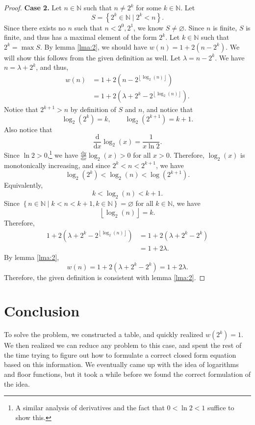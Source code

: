 \documentclass[11pt, letterpaper]{article}
\begin{document}
\begin{proof}
	\textbf{Case 2.} Let $n\in\mathbb{N}$ such that $n\neq 2^k$ for some $k\in\mathbb{N}$. Let
	\[
		S=\left\{ 2^k\in\mathbb{N} \mid 2^k<n \right\} 
	.\]
	Since there exists no $n$ such that $n<2^0,2^1$, we know $S\neq \varnothing$. Since $n$ is finite, $S$ is finite, and thus has a maximal element of the form $2^k$. Let $k\in\mathbb{N}$ such that $2^k=\max S$. By lemma \ref{lma:2}, we should have $w(n)=1+2\left( n-2^k \right) $. We will show this follows from the given definition as well. Let $\lambda =n-2^k$. We have $n=\lambda +2^k$, and thus,
	\begin{align*}
		w(n)&=1+2\left( n-2^{\left\lfloor \log _2(n) \right\rfloor} \right) \\
		    &=1+2\left( \lambda +2^k-2^{\left\lfloor \log_2\left( n \right)  \right\rfloor} \right) 
	.\end{align*}
	Notice that $2^{k+1}>n$ by definition of $S$ and $n$, and notice that
	\[
		\log_2\left( 2^k \right) =k,\qquad \log_2\left( 2^{k+1} \right) =k+1
	.\]
	 Also notice that
	 \[
	 	\frac{\mathrm{d}}{\mathrm{d}x} \log_2(x)=\frac{1}{x\ln 2}
	 .\]
	 Since $\ln 2>0$,\footnote{A similar analysis of derivatives and the fact that $0<\ln 2<1$ suffice to show this.} we have $ \frac{\mathrm{d}y}{\mathrm{d}x}\log_2(x)>0$ for all $x>0$. Therefore, $\log_2(x)$ is monotonically increasing, and since $2^k<n<2^{k+1}$, we have
	 \[
	 	\log_2\left( 2^k \right) <\log_2(n)<\log\left( 2^{k+1} \right) 
	 .\]
	 Equivalently,
	 \[
	 	k<\log_2(n)<k+1
	 .\]
	 Since $\left\{ n\in\mathbb{N} \mid k<n<k+1,k\in\mathbb{N} \right\} =\varnothing$ for all $k\in\mathbb{N}$, we have
	 \[
	 	\left\lfloor \log_2(n) \right\rfloor=k
	 .\]
	 Therefore,
	 \begin{align*}
		 1+2\left( \lambda +2^k-2^{\left\lfloor \log _2(n) \right\rfloor} \right) &=1+2\left( \lambda +2^k-2^{k} \right) \\
											  &=1+2\lambda 
	 .\end{align*}
	 By lemma \ref{lma:2},
	 \[
	 	w(n)=1+2\left( \lambda +2^k-2^k \right) =1+2\lambda 
	 .\]
	 Therefore, the given definition is consistent with lemma \ref{lma:2}.
\end{proof}
\section{Conclusion}
To solve the problem, we constructed a table, and quickly realized $w(2^k)=1$. We then realized we can reduce any problem to this case, and spent the rest of the time trying to figure out how to formulate a correct closed form equation based on this information. We eventually came up with the idea of logarithms and floor functions, but it took a while before we found the correct formulation of the idea.
\end{document}
